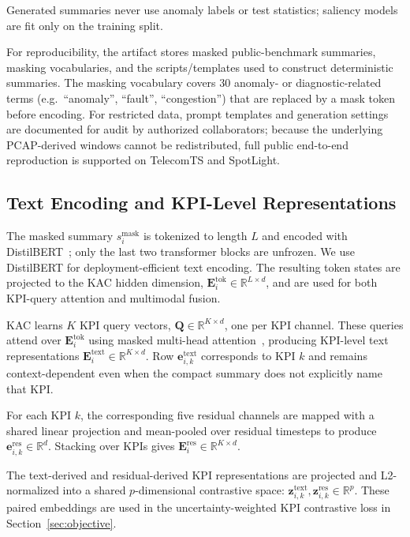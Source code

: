 \documentclass[conference]{IEEEtran}
\begin{document}
Generated summaries never use anomaly labels or test statistics; saliency models are fit only on the training split.

For reproducibility, the artifact stores masked public-benchmark summaries, masking vocabularies, and the scripts/templates used to construct deterministic summaries. The masking vocabulary covers $30$ anomaly- or diagnostic-related terms (e.g.\ ``anomaly'', ``fault'', ``congestion'') that are replaced by a mask token before encoding. For restricted data, prompt templates and generation settings are documented for audit by authorized collaborators; because the underlying PCAP-derived windows cannot be redistributed, full public end-to-end reproduction is supported on TelecomTS and SpotLight.

\subsection{Text Encoding and KPI-Level Representations}
\label{sec:text_encoding}

The masked summary $s_i^{\mathrm{mask}}$ is tokenized to length $L$ and encoded with DistilBERT~\cite{sanh2019distilbert}; only the last two transformer blocks are unfrozen. We use DistilBERT for deployment-efficient text encoding. The resulting token states are projected to the KAC hidden dimension, $\mathbf{E}^{\mathrm{tok}}_i \in \mathbb{R}^{L \times d}$, and are used for both KPI-query attention and multimodal fusion.

KAC learns $K$ KPI query vectors, $\mathbf{Q}\in\mathbb{R}^{K \times d}$, one per KPI channel. These queries attend over $\mathbf{E}^{\mathrm{tok}}_i$ using masked multi-head attention~\cite{vaswani2017attention}, producing KPI-level text representations
$\mathbf{E}^{\mathrm{text}}_i \in \mathbb{R}^{K \times d}$.
Row $\mathbf{e}^{\mathrm{text}}_{i,k}$ corresponds to KPI $k$ and remains context-dependent even when the compact summary does not explicitly name that KPI.

For each KPI $k$, the corresponding five residual channels are mapped with a shared linear projection and mean-pooled over residual timesteps to produce $\mathbf{e}^{\mathrm{res}}_{i,k}\in\mathbb{R}^{d}$. Stacking over KPIs gives $\mathbf{E}^{\mathrm{res}}_i\in\mathbb{R}^{K \times d}$.

The text-derived and residual-derived KPI representations are projected and L2-normalized into a shared $p$-dimensional contrastive space:
$\mathbf{z}^{\mathrm{text}}_{i,k}, \mathbf{z}^{\mathrm{res}}_{i,k}\in\mathbb{R}^{p}$.
These paired embeddings are used in the uncertainty-weighted KPI contrastive loss in Section~\ref{sec:objective}.
\end{document}
